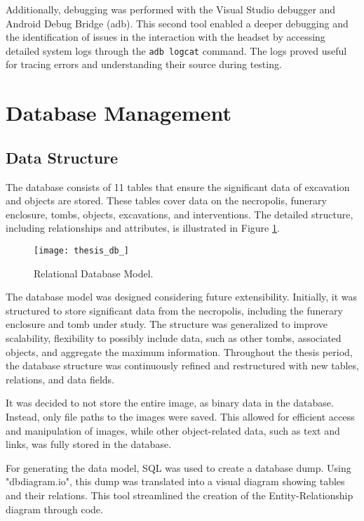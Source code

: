 Additionally, debugging was performed with the Visual Studio debugger and Android Debug Bridge (adb). This second tool enabled a deeper debugging and the identification of issues in the interaction with the headset by accessing detailed system logs through the \texttt{adb logcat} command. The logs proved useful for tracing errors and understanding their source during testing.

\section{Database Management}
\label{sec:database}

\subsection{Data Structure}

The database consists of 11 tables that ensure the significant data of excavation and objects are stored. %
These tables cover data on the necropolis, funerary enclosure, tombs, objects, excavations, and interventions.
The detailed structure, including relationships and attributes, is illustrated in Figure \ref{fig:database}.

\begin{figure}[h!]
    \centering
    \texttt{[image: thesis\_db\_]}
    \caption{Relational Database Model.} 
    \label{fig:database}
\end{figure}


The database model was designed considering future extensibility. Initially, it was structured to store significant data from the necropolis, including the funerary enclosure and tomb under study. The structure was generalized to improve scalability, flexibility to possibly include data, such as other tombs, associated objects, and aggregate the maximum information. 
Throughout the thesis period, the database structure was continuously refined and restructured with new tables, relations, and data fields.

It was decided to not store the entire image, as binary data in the database. Instead, only file paths to the images were saved. This allowed for efficient access and manipulation of images, while other object-related data, such as text and links, was fully stored in the database.

For generating the data model, SQL was used to create a database dump.
Using "dbdiagram.io", this dump was translated into a visual diagram showing tables and their relations. This tool streamlined the creation of the Entity-Relationship diagram through code.



